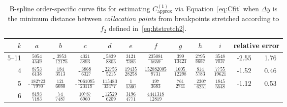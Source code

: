 \begin{sidewaystable}
\centering
\caption[
    B-spline order-specific curve fits for $C_\text{approx}^{(1)}$
    for stretching~\eqref{eq:htstretch2}.
]{%
    B-spline order-specific curve fits for estimating $C_\text{approx}^{(1)}$
    via Equation~\eqref{eq:Cfit} when $\Delta{}y$ is the minimum distance
    between \emph{collocation points} from breakpoints stretched according
    to $f_2$ defined in~\eqref{eq:htstretch2}.
}
\label{tab:C1fit2}
\vspace{1em}
\renewcommand{\arraystretch}{1.40}   %
\begin{tabular}{r|ccccccccc|c@{ -- }c@{\%}}
 $k$ & $a$ & $b$ & $c$ & $d$ & $e$ & $f$ & $g$ & $h$ & $i$
     & \multicolumn{2}{c}{relative error}
\\ \hline
5--11
&  $\frac{            5054}{            4549}$
& -$\frac{            3953}{           12175}$
&  $\frac{            4321}{            5893}$
& -$\frac{            5839}{            8805}$
&  $\frac{            3121}{            7385}$
&  $\frac{          235081}{            5659}$
&  $\frac{             399}{           13421}$
&  $\frac{            2795}{            8687}$
&  $\frac{            3548}{            7037}$
&  -2.55 &  1.76
\\
4
&  $\frac{            8753}{            6138}$
&  $\frac{             184}{            3513}$
& -$\frac{            3868}{            6327}$
& -$\frac{           22756}{            5215}$
&  $\frac{           19435}{           28258}$
&  $\frac{       152882005}{            9731}$
&  $\frac{            1605}{           12298}$
&  $\frac{             814}{            5783}$
&  $\frac{            7755}{           19621}$
&  -1.52 &  0.46
\\
5
& -$\frac{          182723}{            7970}$
&  $\frac{             121}{            6080}$
& -$\frac{         7061095}{           23119}$
&  $\frac{          115483}{           33477}$
&  $\frac{               1}{            5560}$
&  $\frac{             197}{            3683}$
&  $\frac{             761}{            2741}$
& -$\frac{            2307}{            6251}$
&  $\frac{            1845}{            5548}$
&  -1.12 &  0.53
\\
6
&  $\frac{            8193}{            7183}$
&  $\frac{              74}{            7487}$
&  $\frac{           10787}{            6960}$
& -$\frac{           12529}{            6209}$
&  $\frac{            3196}{            4771}$
&  $\frac{         4441318}{           12819}$

\end{tabular}
\end{sidewaystable}
